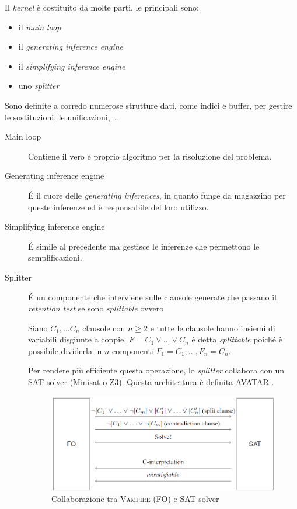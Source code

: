 Il \emph{kernel} è costituito da molte parti, le principali sono:
\begin{itemize}
    \item il \emph{main loop}
    \item il \emph{generating inference engine}
    \item il \emph{simplifying inference engine}
    \item uno \emph{splitter}
\end{itemize}
Sono definite a corredo numerose strutture dati, come indici e buffer, per gestire le sostituzioni, le unificazioni, \dots
\begin{description}
    \item[Main loop] Contiene il vero e proprio algoritmo per la risoluzione del problema.
    \item[Generating inference engine] \'E il cuore delle \emph{generating inferences}, in quanto funge da magazzino per queste inferenze ed è responsabile del 
    loro utilizzo.
    \item[Simplifying inference engine] \'E simile al precedente ma gestisce le inferenze che permettono le semplificazioni.
    \item[Splitter] \'E un componente che interviene sulle clausole generate che passano il \emph{retention test} se sono \emph{splittable} ovvero
    \begin{definition}
        Siano $C_1,\dots C_n$ clausole con $n\geq 2$ e tutte le clausole hanno insiemi di variabili disgiunte a coppie, 
        $F=C_1 \lor \dots \lor C_n$ è detta \emph{splittable} poiché è possibile dividerla in $n$ componenti $F_1=C_1, \dots, F_n=C_n$.
    \end{definition}
    Per rendere più efficiente questa operazione, lo \emph{splitter} collabora con un SAT solver (Minisat o Z3). Questa architettura è definita AVATAR \cite{voronkov2014avatar}. 
    \begin{figure}[H]
        \centering
        \includegraphics[width=\columnwidth]{figures/avatar.png}
        \caption{Collaborazione tra \textsc{Vampire} (FO) e SAT solver \cite{voronkov2014avatar}}
    \end{figure}
\end{description}

